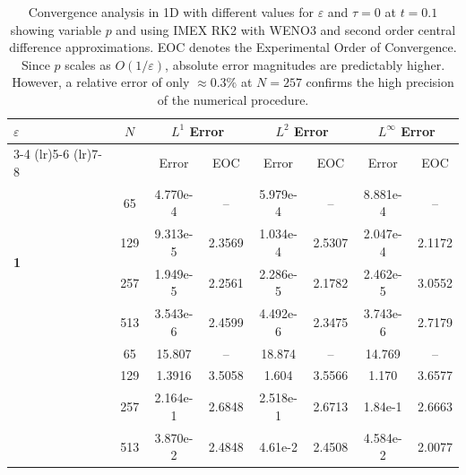 \documentclass[final,11pt]{siamart251216}
\numberwithin{equation}{section}
\theoremstyle{definition}
\theoremstyle{remark}
\begin{document}
\begin{table}[htbp]
    \centering
    \small
    \begin{tabular}{@{} l c cc cc cc @{}}
        \toprule
        \multirow{2}{*}{\textbf{$\varepsilon$}} & \multirow{2}{*}{$N$} & \multicolumn{2}{c}{\textbf{$L^1$ Error}} & \multicolumn{2}{c}{\textbf{$L^2$ Error}} & \multicolumn{2}{c}{\textbf{$L^\infty$ Error}} \\
        \cmidrule(lr){3-4} \cmidrule(lr){5-6} \cmidrule(lr){7-8}
        & & Error & EOC & Error & EOC & Error & EOC \\
        \midrule
        \multirow{4}{*}{\textbf{1}} 
		& 65  & 4.770e-4 & -- & 5.979e-4 & -- & 8.881e-4 & -- \\
       & 129  & 9.313e-5 & 2.3569 & 1.034e-4 & 2.5307 & 2.047e-4 & 2.1172 \\
        & 257  & 1.949e-5 & 2.2561 & 2.286e-5 & 2.1782 & 2.462e-5 & 3.0552 \\
        & 513  & 3.543e-6 & 2.4599 & 4.492e-6 & 2.3475 & 3.743e-6 & 2.7179 \\
        
        \addlinespace[0.3cm]
        \multirow{4}{*}{\textbf{0.01}} 
		& 65  & 15.807 & -- & 18.874 & -- & 14.769 & -- \\
       & 129  & 1.3916 & 3.5058 & 1.604 & 3.5566 & 1.170 & 3.6577 \\
        & 257  & 2.164e-1 & 2.6848 & 2.518e-1 & 2.6713 & 1.84e-1 & 2.6663 \\
        & 513  & 3.870e-2 & 2.4848 & 4.61e-2 & 2.4508 & 4.584e-2 & 2.0077 \\

        
        \bottomrule
    \end{tabular}
    \caption{Convergence analysis in 1D with different values for $\varepsilon$ and $\tau = 0$ at $t = 0.1$ showing variable $p$ and using IMEX RK2 with WENO3 and second order central difference approximations. EOC denotes the Experimental Order of Convergence. Since $p$ scales as $O(1/\varepsilon)$, absolute error magnitudes are predictably higher. However, a relative error of only $\approx 0.3 \%$ at $N=257$ confirms the high precision of the numerical procedure.}
    \label{tab:convergence_1Dptau0}
\end{table}
\end{document}
